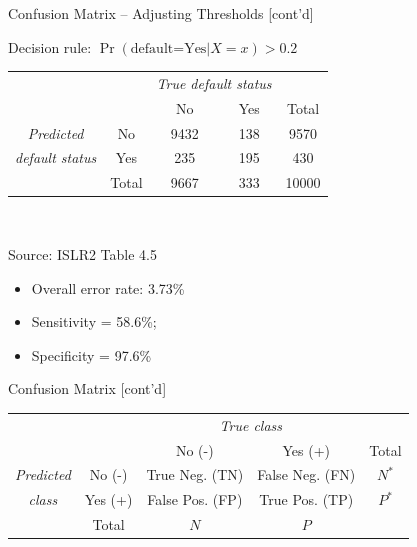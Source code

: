 \documentclass[ignorenonframetext,xcolor=x11names]{beamer}
\begin{document}
\begin{frame}[label=full]{Confusion Matrix -- Adjusting Thresholds \small [cont'd]}
\begin{block}{}
\begin{center}
\renewcommand{\arraystretch}{1.25}

Decision rule: $\Pr(\text{default=Yes} | X=x) > 0.2$ \\ \vspace{2mm}
\begin{tabular}{cc|cc|c} \hline
     & & \multicolumn{2}{c|}{\emph{True default status}} \\
     & & No & Yes & Total \\ \hline
\emph{Predicted} & No & 9432 & 138 & 9570 \\ 
\emph{default status} & Yes & 235 & 195 & 430 \\ \hline
     & Total & 9667 & 333 & 10000 \\ \hline
\end{tabular} \\
\end{center}

\scriptsize Source: ISLR2 Table 4.5
\end{block}

\begin{itemize}
  \item Overall error rate: 3.73\% 
  \item Sensitivity = 58.6\%;
  \item Specificity = 97.6\%
\end{itemize}
\end{frame}

\begin{frame}[label=full]{Confusion Matrix \small [cont'd]}
\begin{block}{}
\small
\begin{center}
\renewcommand{\arraystretch}{1.25}

\begin{tabular}{cc|cc|c} \hline
     & & \multicolumn{2}{c|}{\emph{True class}} \\
     & & No (-) & Yes (+) & Total \\ \hline
\emph{Predicted} & No (-) & True Neg. (TN) & False Neg. (FN) & $N^*$ \\ 
\emph{class} & Yes (+) & False Pos. (FP) & True Pos. (TP) & $P^*$ \\ \hline
     & Total & $N$ & $P$ &  \\ \hline
\end{tabular} \\
\end{center}
\end{block}
\end{frame}
\end{document}
